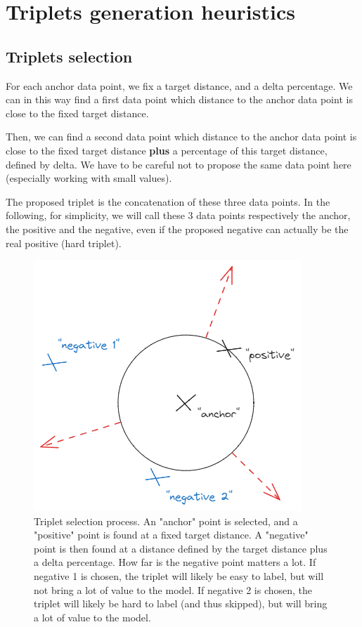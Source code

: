 \appendix
\label{sec:appendix}

\section{Triplets generation heuristics}
\label{sec:triplet-generation-heuristics}

\subsection{Triplets selection}

For each anchor data point, we fix a target distance, and a delta percentage.
We can in this way find a first data point which distance to the anchor data point is close to the fixed target distance.

Then, we can find a second data point which distance to the anchor data point is close to the fixed target distance \textbf{plus} a percentage of this target distance, defined by delta. We have to be careful not to propose the same data point here (especially working with small values).

The proposed triplet is the concatenation of these three data points. In the following, for simplicity, we will call these 3 data points respectively the anchor, the positive and the negative, even if the proposed negative can actually be the real positive (hard triplet).

\begin{figure}[h]
    \centering
    \includegraphics[width=0.4\columnwidth]{images/triplet_generation.png}
    \caption{Triplet selection process. An "anchor" point is selected, and a "positive" point is found at a fixed target distance. A "negative" point is then found at a distance defined by the target distance plus a delta percentage. How far is the negative point matters a lot. If negative 1 is chosen, the triplet will likely be easy to label, but will not bring a lot of value to the model. If negative 2 is chosen, the triplet will likely be hard to label (and thus skipped), but will bring a lot of value to the model.}
    \label{fig:triplet_generation}
\end{figure}

